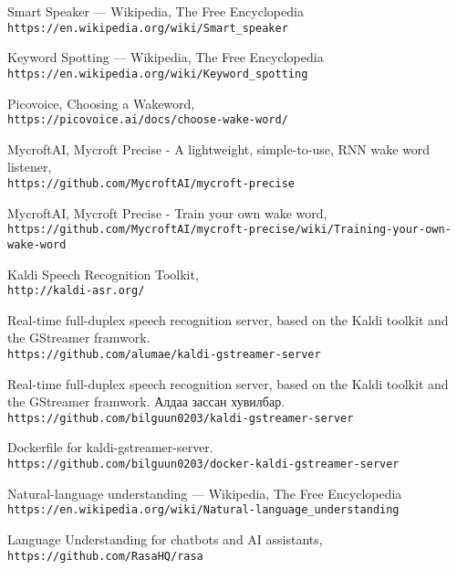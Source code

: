 \renewcommand\bibname{Ном зүй}
\begin{thebibliography}{9}
	Smart Speaker --- {W}ikipedia{,} The Free Encyclopedia
	\\\texttt{https://en.wikipedia.org/wiki/Smart\_speaker}

	Keyword Spotting --- {W}ikipedia{,} The Free Encyclopedia
	\\\texttt{https://en.wikipedia.org/wiki/Keyword\_spotting}

	Picovoice, Choosing a Wakeword,
	\\\texttt{https://picovoice.ai/docs/choose-wake-word/}

	MycroftAI, Mycroft Precise - A lightweight, simple-to-use, RNN wake word listener,
	\\\texttt{https://github.com/MycroftAI/mycroft-precise}

	MycroftAI, Mycroft Precise - Train your own wake word,
	\\\texttt{https://github.com/MycroftAI/mycroft-precise/wiki/Training-your-own-wake-word}

	Kaldi Speech Recognition Toolkit,
	\\\texttt{http://kaldi-asr.org/}

	Real-time full-duplex speech recognition server, based on the Kaldi toolkit and the GStreamer framwork.
	\\\texttt{https://github.com/alumae/kaldi-gstreamer-server}

	Real-time full-duplex speech recognition server, based on the Kaldi toolkit and the GStreamer framwork. Алдаа зассан хувилбар.
	\\\texttt{https://github.com/bilguun0203/kaldi-gstreamer-server}

	Dockerfile for kaldi-gstreamer-server.
	\\\texttt{https://github.com/bilguun0203/docker-kaldi-gstreamer-server}

	Natural-language understanding --- {W}ikipedia{,} The Free Encyclopedia
	\\\texttt{https://en.wikipedia.org/wiki/Natural-language\_understanding}

	Language Understanding for chatbots and AI assistants,
	\\\texttt{https://github.com/RasaHQ/rasa}


\end{thebibliography}
